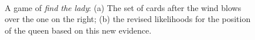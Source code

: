 \documentclass[xcolor={table}]{beamer}
\begin{document}
 \begin{frame} [plain]
\begin{figure}
\centering
{} \\
\caption{A game of \textit{find the lady}: (a) The set of cards after the wind blows over the one on the right; (b) the revised likelihoods for the position of the queen based on this new evidence.}
\label{fig:3cardTrick4}
\end{figure}
\end{frame} 
\end{document}
